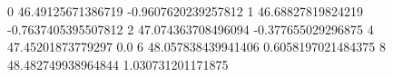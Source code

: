 0 46.49125671386719 -0.9607620239257812
1 46.68827819824219 -0.7637405395507812
2 47.074363708496094 -0.377655029296875
4 47.45201873779297 0.0
6 48.057838439941406 0.6058197021484375
8 48.482749938964844 1.030731201171875
